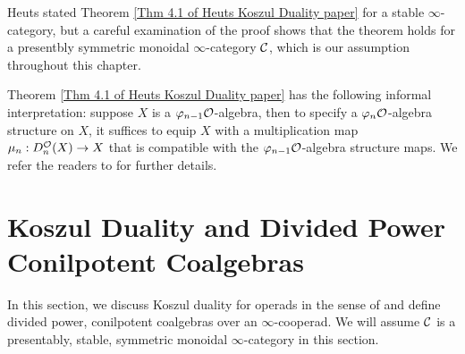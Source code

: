 \begin{remark}
Heuts stated Theorem \ref{Thm 4.1 of Heuts Koszul Duality paper} for a stable $\infty$-category, but a careful examination of the proof shows that the theorem holds for a presentbly symmetric monoidal $\infty$-category ${\mathcal{C}}$, which is our assumption throughout this chapter.
\end{remark}

\begin{remark}
Theorem \ref{Thm 4.1 of Heuts Koszul Duality paper} has the following informal interpretation: suppose $X$ is a $\varphi_{n-1}{\mathcal{O}}$-algebra, then to specify a $\varphi_n{\mathcal{O}}$-algebra structure on $X$, it suffices to equip $X$ with a multiplication map $\mu_n: D^{{\mathcal{O}}}_n(X)\to X$ that is compatible with the $\varphi_{n-1}{\mathcal{O}}$-algebra structure maps. We refer the readers to \cite{Heuts_Koszul} for further details.
\end{remark}





\section{Koszul Duality and Divided Power Conilpotent  Coalgebras }
\label{Coalgebras over cooperads and Koszul Duality}
In this section, we discuss Koszul duality for operads in the sense of \cite{Ginzburg-Kapranov} and define divided power, conilpotent coalgebras over an $\infty$-cooperad. 
We will assume ${\mathcal{C}}$ is a presentably, stable, symmetric monoidal $\infty$-category in this section.

